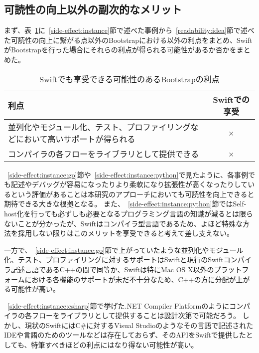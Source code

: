 \subsection{可読性の向上以外の副次的なメリット}

まず、表~\ref{table:bootstrap-merit}に~\ref{side-effect:instance}節で述べた事例から~\ref{readability:idea}節で述べた可読性の向上に繋がる点以外のBootstrapにおける以外の利点をまとめ、SwiftがBootstrapを行った場合にそれらの利点が得られる可能性があるか否かをまとめた。

\begin{table}[hb]
    \begin{center}
        \caption{Swiftでも享受できる可能性のあるBootstrapの利点}
        \begin{tabular}{|m{10cm}|c|}
            \hline
            利点 & Swiftでの享受 \\
            \hline
            並列化やモジュール化、テスト、プロファイリングなどにおいて高いサポートが得られる & × \\
            \hline
            コンパイラの各フローをライブラリとして提供できる & × \\
            \hline
        \end{tabular}
        \label{table:bootstrap-merit}
    \end{center}
\end{table}


~\ref{side-effect:instance:go}節や~\ref{side-effect:instance:python}で見たように、各事例でも記述やデバッグが容易になったりより柔軟になり拡張性が高くなったりしているという評価があることは本研究のアプローチにおいても可読性を向上できると期待できる大きな根拠となる。
また、~\ref{side-effect:instance:python}節ではSelf-host化を行っても必ずしも必要となるプログラミング言語の知識が減るとは限らないことが分かったが、Swiftはコンパイラ型言語であるため、よほど特殊な方法を採用しない限りはこのメリットを享受できると考えて差し支えない。

一方で、~\ref{side-effect:instance:go}節で上がっていたような並列化やモジュール化、テスト、プロファイリングに対するサポートはSwiftと現行のSwiftコンパイラ記述言語であるC++の間で同等か、Swiftは特にMac OS X以外のプラットフォームにおける各機能のサポートが未だ不十分なため、C++の方に分配が上がる可能性が高い。

~\ref{side-effect:instance:csharp}節で挙げた.NET Compiler Platformのようにコンパイラの各フローをライブラリとして提供することは設計次第で可能だろう。
しかし、現状のSwiftにはC\#に対するVisual Studioのようなその言語で記述されたIDEや言語のためのツールなどは存在しておらず、そのAPIをSwiftで提供したとしても、特筆すべきほどの利点にはなり得ない可能性が高い。


